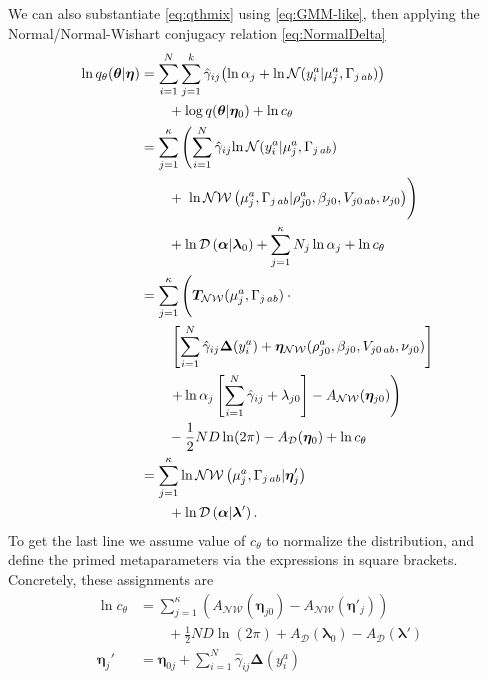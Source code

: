 \documentclass[aps,showpacs,twocolumn,prd,superscriptaddress,nofootinbib]{revtex4}
\newcommand{\nn}{\nonumber}
\begin{document}
We can also substantiate \eqref{eq:qthmix} using \eqref{eq:GMM-like}, then applying the Normal/Normal-Wishart conjugacy relation \eqref{eq:NormalDelta}
\begin{align}
  \ln q_\theta(\bm\theta|\bm\eta)
  &=\sum_{i=1}^N\sum_{j=1}^k\hat\gamma_{ij}
       {\left(\ln\alpha_j+\ln\mathcal{N}(y_i^a|\mu_j^a,\Gamma_{j\,ab})\right)}\nn\\
       &\qquad+\log q(\bm\theta|\bm\eta_0)+\ln c_\theta\nn\\
  &=\sum_{j=1}^\kappa\left(\sum_{i=1}^N\hat\gamma_{ij}
       {\ln\mathcal{N}(y_i^a|\mu_j^a,\Gamma_{j\,ab})}\right.\nn\\
       &\qquad+\left.\vphantom{\sum_{i=1}^N}
       \ln\mathcal{NW}\left(\mu_j^a,\Gamma_{j\,ab}|\rho_{j0}^a,\beta_{j0},V_{j0\,ab},\nu_{j0}\right)\right)\nn\\
       &\qquad+\ln\mathcal{D}\left(\bm\alpha|\bm\lambda_0\right)
       +\sum_{j=1}^\kappa N_j\ln\alpha_j
       +\ln c_\theta
       \nn\\
  &=\sum_{j=1}^\kappa\left(
       \vphantom{\sum_{i=1}^N} 
       \bm T_{\mathcal{NW}}(\mu_j^a,\Gamma_{j\,ab})\cdot
       \vphantom{\frac12}\right.
       \nn\\&\qquad
       \left.
       \left[\sum_{i=1}^N\hat\gamma_{ij}\bm\Delta(y_i^a)
       +\bm\eta_{\mathcal{NW}}(\rho_{j0}^a,\beta_{j0},V_{j0\,ab},\nu_{j0})\right]
       \vphantom{\sum_{i=1}^N}\right.       
       \nn\\&\qquad
       \left.
       +\ln\alpha_j\left[\sum_{i=1}^N\hat\gamma_{ij} +\lambda_{j0}\right]
       -A_{\mathcal{NW}}(\bm\eta_{j0})
       \vphantom{\sum_{i=1}^N}\right)
       \nn\\&\qquad
       \vphantom{\frac12}
       -\frac12ND\ln(2\pi)
       -A_{\mathcal{D}}(\bm\eta_0)+\ln c_\theta
       \nn\\
  &=\sum_{j=1}^\kappa\ln\mathcal{NW}\left(\mu_j^a,\Gamma_{j\,ab}|\bm\eta'_{j}\right)\nn\\
       &\qquad+\ln\mathcal{D}\left(\bm\alpha|\bm\lambda'\right).\label{eq:qth-gmm}
\end{align}
To get the last line we assume value of $c_\theta$ to normalize the distribution, and define the primed metaparameters via the expressions in square brackets.  Concretely, these assignments are
\begin{align}
  \ln c_\theta&=\sum_{j=1}^\kappa\left( A_{\mathcal{NW}}(\bm\eta_{j0})-A_{\mathcal{NW}}(\bm\eta'_{j})\right)
  \nn\\&\qquad
  +\frac12ND\ln(2\pi)+A_{\mathcal{D}}\left(\bm\lambda_0\right)-A_{\mathcal{D}}\left(\bm\lambda'\right)\label{eq:Cth}\\
  \bm\eta_j'&=\bm\eta_{0j}+\sum_{i=1}^N\hat\gamma_{ij}\bm\Delta(y_i^a)\nn
\end{align}
\end{document}
